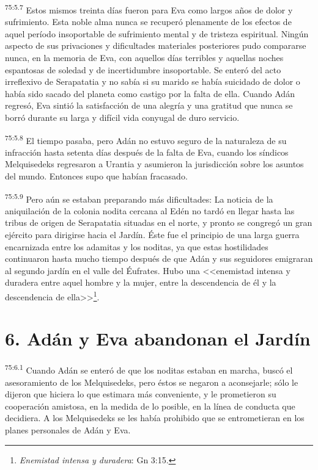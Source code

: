 \par
\textsuperscript{75:5.7} Estos mismos treinta días fueron para Eva como largos años de dolor y sufrimiento. Esta noble alma nunca se recuperó plenamente de los efectos de aquel período insoportable de sufrimiento mental y de tristeza espiritual. Ningún aspecto de sus privaciones y dificultades materiales posteriores pudo compararse nunca, en la memoria de Eva, con aquellos días terribles y aquellas noches espantosas de soledad y de incertidumbre insoportable. Se enteró del acto irreflexivo de Serapatatia y no sabía si su marido se había suicidado de dolor o había sido sacado del planeta como castigo por la falta de ella. Cuando Adán regresó, Eva sintió la satisfacción de una alegría y una gratitud que nunca se borró durante su larga y difícil vida conyugal de duro servicio.

\par
\textsuperscript{75:5.8} El tiempo pasaba, pero Adán no estuvo seguro de la naturaleza de su infracción hasta setenta días después de la falta de Eva, cuando los síndicos Melquisedeks regresaron a Urantia y asumieron la jurisdicción sobre los asuntos del mundo. Entonces supo que habían fracasado.

\par
\textsuperscript{75:5.9} Pero aún se estaban preparando más dificultades: La noticia de la aniquilación de la colonia nodita cercana al Edén no tardó en llegar hasta las tribus de origen de Serapatatia situadas en el norte, y pronto se congregó un gran ejército para dirigirse hacia el Jardín. Éste fue el principio de una larga guerra encarnizada entre los adamitas y los noditas, ya que estas hostilidades continuaron hasta mucho tiempo después de que Adán y sus seguidores emigraran al segundo jardín en el valle del Éufrates. Hubo una <<enemistad intensa y duradera entre aquel hombre y la mujer, entre la descendencia de él y la descendencia de ella>>\footnote{\textit{Enemistad intensa y duradera}: Gn 3:15.}.

\section*{6. Adán y Eva abandonan el Jardín}
\par
\textsuperscript{75:6.1} Cuando Adán se enteró de que los noditas estaban en marcha, buscó el asesoramiento de los Melquisedeks, pero éstos se negaron a aconsejarle; sólo le dijeron que hiciera lo que estimara más conveniente, y le prometieron su cooperación amistosa, en la medida de lo posible, en la línea de conducta que decidiera. A los Melquisedeks se les había prohibido que se entrometieran en los planes personales de Adán y Eva.

